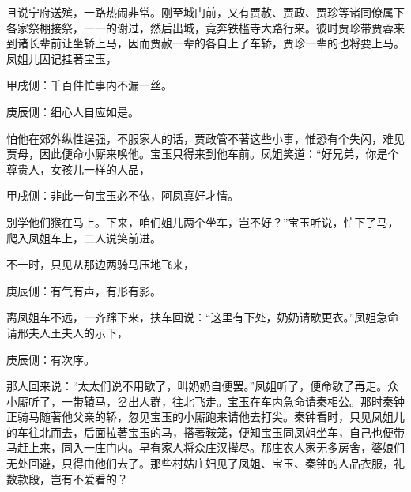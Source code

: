 \begin{parag}
    且说宁府送殡，一路热闹非常。刚至城门前，又有贾赦、贾政、贾珍等诸同僚属下各家祭棚接祭，一一的谢过，然后出城，竟奔铁槛寺大路行来。彼时贾珍带贾蓉来到诸长辈前让坐轿上马，因而贾赦一辈的各自上了车轿，贾珍一辈的也将要上马。凤姐儿因记挂著宝玉，\begin{note}甲戌侧：千百件忙事内不漏一丝。\end{note}\begin{note}庚辰侧：细心人自应如是。\end{note}怕他在郊外纵性逞强，不服家人的话，贾政管不著这些小事，惟恐有个失闪，难见贾母，因此便命小厮来唤他。宝玉只得来到他车前。凤姐笑道：“好兄弟，你是个尊贵人，女孩儿一样的人品，\begin{note}甲戌侧：非此一句宝玉必不依，阿凤真好才情。\end{note}别学他们猴在马上。下来，咱们姐儿两个坐车，岂不好？”宝玉听说，忙下了马，爬入凤姐车上，二人说笑前进。
\end{parag}


\begin{parag}
    不一时，只见从那边两骑马压地飞来，\begin{note}庚辰侧：有气有声，有形有影。\end{note}离凤姐车不远，一齐蹿下来，扶车回说：“这里有下处，奶奶请歇更衣。”凤姐急命请邢夫人王夫人的示下，\begin{note}庚辰侧：有次序。\end{note}那人回来说：“太太们说不用歇了，叫奶奶自便罢。”凤姐听了，便命歇了再走。众小厮听了，一带辕马，岔出人群，往北飞走。宝玉在车内急命请秦相公。那时秦钟正骑马随著他父亲的轿，忽见宝玉的小厮跑来请他去打尖。秦钟看时，只见凤姐儿的车往北而去，后面拉著宝玉的马，搭著鞍笼，便知宝玉同凤姐坐车，自己也便带马赶上来，同入一庄门内。早有家人将众庄汉撵尽。那庄农人家无多房舍，婆娘们无处回避，只得由他们去了。那些村姑庄妇见了凤姐、宝玉、秦钟的人品衣服，礼数款段，岂有不爱看的？
\end{parag}


